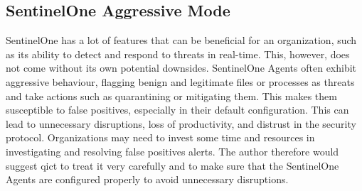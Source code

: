 

\subsection{SentinelOne Aggressive Mode}
SentinelOne has a lot of features that can be beneficial for an organization, such as its ability to detect and respond to threats in real-time.
This, however, does not come without its own potential downsides. SentinelOne Agents often exhibit aggressive behaviour, flagging benign and legitimate
files or processes as threats and take actions such as quarantining or mitigating them. This makes them susceptible to false positives,
especially in their default configuration. This can lead to unnecessary disruptions, loss of productivity, and distrust in the security protocol. Organizations
may need to invest some time and resources in investigating and resolving false positives alerts. The author therefore would suggest \acrshort{qict} to
treat it very carefully and to make sure that the SentinelOne Agents are configured properly to avoid unnecessary disruptions.








